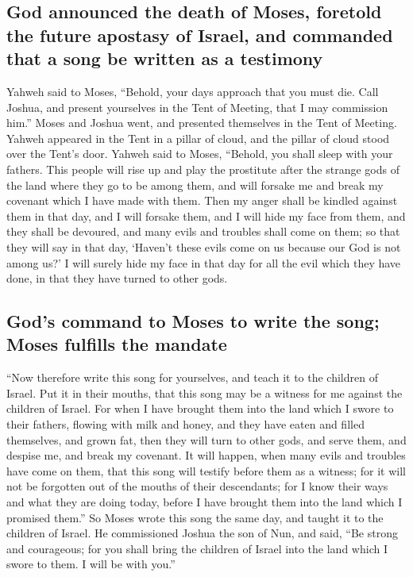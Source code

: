 \hypertarget{god-announced-the-death-of-moses-foretold-the-future-apostasy-of-israel-and-commanded-that-a-song-be-written-as-a-testimony}{%
\subsection{God announced the death of Moses, foretold the future
apostasy of Israel, and commanded that a song be written as a
testimony}\label{god-announced-the-death-of-moses-foretold-the-future-apostasy-of-israel-and-commanded-that-a-song-be-written-as-a-testimony}}

 Yahweh said to Moses, ``Behold, your days approach that
you must die. Call Joshua, and present yourselves in the Tent of
Meeting, that I may commission him.'' Moses and Joshua went, and
presented themselves in the Tent of Meeting.  Yahweh
appeared in the Tent in a pillar of cloud, and the pillar of cloud stood
over the Tent's door.  Yahweh said to Moses, ``Behold,
you shall sleep with your fathers. This people will rise up and play the
prostitute after the strange gods of the land where they go to be among
them, and will forsake me and break my covenant which I have made with
them.  Then my anger shall be kindled against them in
that day, and I will forsake them, and I will hide my face from them,
and they shall be devoured, and many evils and troubles shall come on
them; so that they will say in that day, `Haven't these evils come on us
because our God is not among us?'  I will surely hide my
face in that day for all the evil which they have done, in that they
have turned to other gods.

\hypertarget{gods-command-to-moses-to-write-the-song-moses-fulfills-the-mandate}{%
\subsection{God's command to Moses to write the song; Moses fulfills the
mandate}\label{gods-command-to-moses-to-write-the-song-moses-fulfills-the-mandate}}

 ``Now therefore write this song for yourselves, and
teach it to the children of Israel. Put it in their mouths, that this
song may be a witness for me against the children of Israel.
 For when I have brought them into the land which I swore
to their fathers, flowing with milk and honey, and they have eaten and
filled themselves, and grown fat, then they will turn to other gods, and
serve them, and despise me, and break my covenant.  It
will happen, when many evils and troubles have come on them, that this
song will testify before them as a witness; for it will not be forgotten
out of the mouths of their descendants; for I know their ways and what
they are doing today, before I have brought them into the land which I
promised them.''  So Moses wrote this song the same day,
and taught it to the children of Israel.  He commissioned
Joshua the son of Nun, and said, ``Be strong and courageous; for you
shall bring the children of Israel into the land which I swore to them.
I will be with you.''

